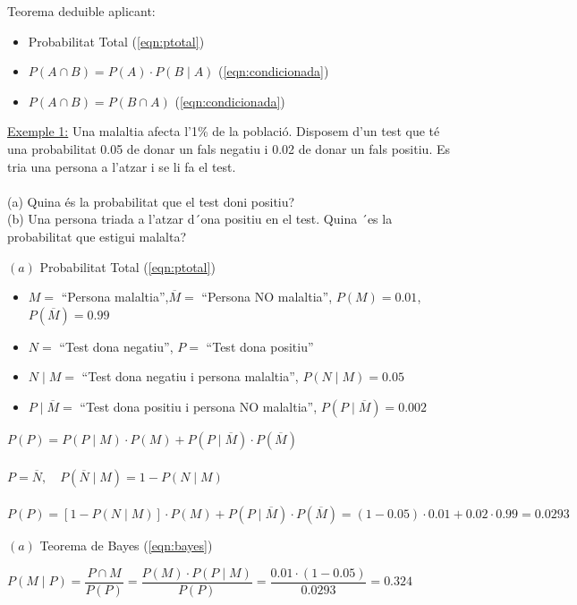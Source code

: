 \documentclass{article}
\begin{document}
Teorema deduible aplicant:
\begin{itemize}
    \item Probabilitat Total (\ref{eqn:ptotal})
    \item $P(A\cap B) = P(A) \cdot P(B\mid A)$ (\ref{eqn:condicionada})
    \item $P(A\cap B) = P(B\cap A)$ (\ref{eqn:condicionada})
\end{itemize}

\underline{Exemple 1:} Una malaltia afecta l’1\% de la població. Disposem d’un test que té una probabilitat
0.05 de donar un fals negatiu i 0.02 de donar un fals positiu. Es tria una persona a l’atzar i se li fa
el test. \\\\
(a) Quina és la probabilitat que el test doni positiu?\\
(b) Una persona triada a l’atzar d´ona positiu en el test.
Quina ´es la probabilitat que estigui malalta?

$(a)$ Probabilitat Total (\ref{eqn:ptotal})
\begin{itemize}
    \item $M=$ ``Persona malaltia'',\space\space $\overline{M}=$ ``Persona NO malaltia'', \quad $P(M) = 0.01$, \space $P(\overline{M}) = 0.99$
    \item $N=$ ``Test dona  negatiu'', \quad $P=$ ``Test dona  positiu''
    \item $N \mid M=$ ``Test dona negatiu i persona malaltia'', $P(N \mid M)=0.05$
    \item $P \mid \overline{M}=$ ``Test dona positiu i persona NO malaltia'', $P(P \mid \overline{M})=0.002$
\end{itemize}

$P(P) = P(P\mid M)\cdot P(M) +  P(P\mid \overline{M})\cdot P(\overline{M})$ \\\\
$P = \overline{N}, \quad P(\overline{N}\mid M) = 1-P(N\mid M)$ \\\\
$P(P)=\left[1-P(N\mid M)\right] \cdot P(M) + P(P\mid \overline{M})\cdot P(\overline{M}) = (1-0.05)\cdot 0.01 + 0.02\cdot 0.99 = 0.0293$

$(a)$ Teorema de Bayes (\ref{eqn:bayes})

$P(M\mid P) = \dfrac{P\cap M}{P(P)} =  \dfrac{P(M) \cdot P(P\mid M)}{P(P)} = \dfrac{0.01 \cdot (1-0.05)}{0.0293} = 0.324$ \\\\
\end{document}
